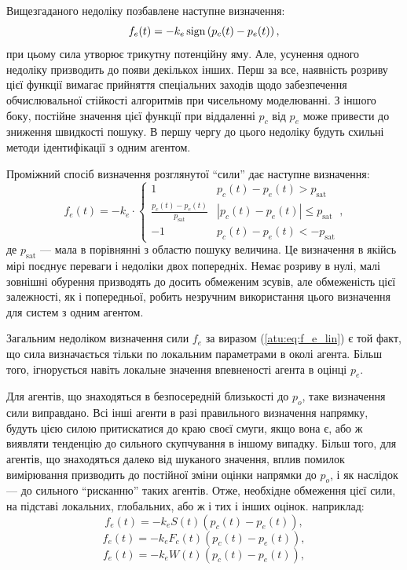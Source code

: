Вищезгаданого недоліку позбавлене наступне визначення:
%
\begin{equation}
  f_e(t) = - k_e \operatorname*{sign} \left( p_c(t) - p_e(t) \right) ,
  \label{atu:eq:f_e_sign}
\end{equation}
%
при цьому сила утворює трикутну потенційну яму.
Але, усунення одного
недоліку призводить до появи декількох інших. Перш за все,
наявність розриву цієї функції вимагає прийняття спеціальних
заходів щодо забезпечення обчислювальної стійкості алгоритмів
при чисельному моделюванні. З іншого боку, постійне значення
цієї функції при віддаленні
$p_c$ від
$p_e$ може привести до зниження швидкості пошуку. В першу чергу
до цього недоліку будуть схильні методи ідентифікації з одним
агентом.

Проміжний спосіб визначення розглянутої ``сили'' дає наступне
визначення:
%
\begin{equation}
  f_e(t)
  = - k_e \cdot
  \begin{cases}
    1 &  p_c(t) - p_e(t)  > p_\mathrm{sat}
    \\
    \frac{p_c(t)-p_e(t)}{p_\mathrm{sat}} & | p_c(t)-p_e(t)| \le p_\mathrm{sat}
    \\
    -1 &  p_c(t) - p_e(t)  < -p_\mathrm{sat}
  \end{cases},
  \label{atu:eq:f_e_sat}
\end{equation}
%
де  $p_\mathrm{sat}$ ---
мала в порівнянні з областю пошуку величина. Це визначення в
якійсь мірі поєднує переваги і недоліки двох попередніх. Немає
розриву в нулі, малі зовнішні обурення призводять до досить
обмеженим зсувів, але обмеженість цієї залежності, як і
попередньої, робить незручним використання цього визначення
для систем з одним агентом.

Загальним недоліком визначення сили $f_e$ за виразом (\ref{atu:eq:f_e_lin})
є той факт, що сила визначається тільки по локальним параметрами в околі
агента. Більш того, ігнорується навіть локальне значення впевненості агента в
оцінці $p_e$.

Для агентів, що знаходяться в безпосередній близькості до
$p_o$, таке визначення сили виправдано. Всі інші агенти в разі
правильного визначення напрямку, будуть цією силою притискатися
до краю своєї смуги, якщо вона є, або ж виявляти тенденцію до
сильного скупчування в іншому випадку. Більш того, для агентів,
що знаходяться далеко від шуканого значення, вплив помилок
вимірювання призводить до постійної зміни оцінки напрямки до
$p_o$, і як наслідок --- до сильного ``рисканню'' таких агентів. Отже,
необхідне обмеження цієї сили, на підставі локальних,
глобальних, або ж і тих і інших оцінок. наприклад:
%
\begin{equation}
  f_e(t) = - k_e S(t) \left( p_c(t) - p_e(t) \right) ,
  \label{atu:eq:f_e_lin_S}
\end{equation}
%
\begin{equation}
  f_e(t) = - k_e F_c(t) \left( p_c(t) - p_e(t) \right) ,
  \label{atu:eq:f_e_lin_F}
\end{equation}
%
\begin{equation}
  f_e(t) = - k_e W(t) \left( p_c(t) - p_e(t) \right) ,
  \label{atu:eq:f_e_lin_W}
\end{equation}


